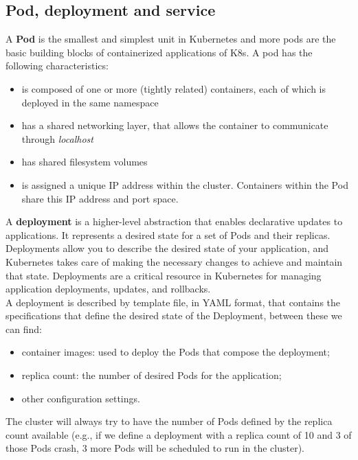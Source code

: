 \subsection{Pod, deployment and service}
A \textbf{Pod} is the smallest and simplest unit in Kubernetes and more pods are the basic building blocks of containerized applications of K8s. A pod has the following characteristics:
\begin{itemize}
   \item is composed of one or more (tightly related) containers, each of which is deployed in the same namespace
   \item has a shared networking layer, that allows the container to communicate through \textit{localhost}
   \item has shared filesystem volumes
   \item is assigned a unique IP address within the cluster. Containers within the Pod share this IP address and port space.
\end{itemize}

A \textbf{deployment} is a higher-level abstraction that enables declarative updates to applications. It represents a desired state for a set of Pods and their replicas. Deployments allow you to describe the desired state of your application, and Kubernetes takes care of making the necessary changes to achieve and maintain that state. Deployments are a critical resource in Kubernetes for managing application deployments, updates, and rollbacks.\\
A deployment is described by template file, in YAML format, that contains the specifications that define the desired state of the Deployment, between these we can find:
\begin{itemize}
   \item container images: used to deploy the Pods that compose the deployment;
   \item replica count: the number of desired Pods for the application;
   \item other configuration settings.
\end{itemize}
The cluster will always try to have the number of Pods defined by the replica count available (e.g., if we define a deployment with a replica count of 10 and 3 of those Pods crash, 3 more Pods will be scheduled to run in the cluster).

